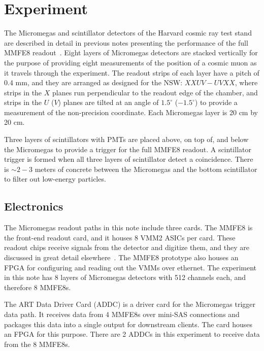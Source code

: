 \section{Experiment}
\label{sec:exp}

The Micromegas and scintillator detectors of the Harvard cosmic ray test stand are described in detail in previous notes presenting the performance of the full MMFE8 readout~\cite{noisy,noiseless}. Eight layers of Micromegas detectors are stacked vertically for the purpose of providing eight measurements of the position of a cosmic muon as it travels through the experiment. The readout strips of each layer have a pitch of 0.4 mm, and they are arranged as designed for the NSW: $XXUV-UVXX$, where strips in the $X$ planes run perpendicular to the readout edge of the chamber, and strips in the $U$ ($V$) planes are tilted at an angle of $1.5^\circ$ ($-1.5^\circ$) to provide a measurement of the non-precision coordinate. Each Micromegas layer is 20 cm by 20 cm.

Three layers of scintillators with PMTs are placed above, on top of, and below the Micromegas to provide a trigger for the full MMFE8 readout. A scintillator trigger is formed when all three layers of scintillator detect a coincidence. There is $\sim\!2\!-\!3$ meters of concrete between the Micromegas and the bottom scintillator to filter out low-energy particles.

\subsection{Electronics}
\label{sec:exp-elx}

The Micromegas readout paths in this note include three cards. The MMFE8 is the front-end readout card, and it houses 8 VMM2 ASICs per card. These readout chips receive signals from the detector and digitize them, and they are discussed in great detail elsewhere~\cite{nswtdr,noisy,noiseless}. The MMFE8 prototype also houses an FPGA for configuring and reading out the VMMs over ethernet. The experiment in this note has 8 layers of Micromegas detectors with 512 channels each, and therefore 8 MMFE8s.

The ART Data Driver Card (ADDC) is a driver card for the Micromegas trigger data path. It receives data from 4 MMFE8s over mini-SAS connections and packages this data into a single output for downstream clients. The card houses an FPGA for this purpose. There are 2 ADDCs in this experiment to receive data from the 8 MMFE8s.


